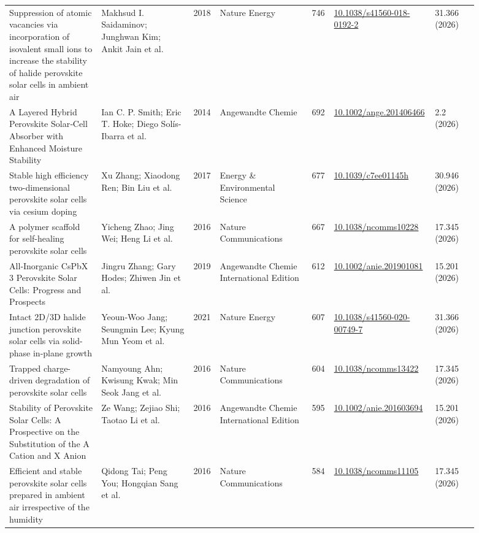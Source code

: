 \documentclass[10pt,a4paper]{article}
\begin{document}
{\begin{longtable}{p{0.197\linewidth}p{0.197\linewidth}p{0.043\linewidth}p{0.197\linewidth}p{0.043\linewidth}p{0.117\linewidth}p{0.098\linewidth}}
Suppression of atomic vacancies via incorporation of isovalent small ions to increase the stability of halide perovskite solar cells in ambient air & Makhsud I. Saidaminov; Junghwan Kim; Ankit Jain et al. & 2018 & Nature Energy & 746 & \href{https://doi.org/10.1038/s41560-018-0192-2}{10.1038/s41560-018-0192-2} & 31.366 (2026) \\
A Layered Hybrid Perovskite Solar‐Cell Absorber with Enhanced Moisture Stability & Ian C. P. Smith; Eric T. Hoke; Diego Solís-Ibarra et al. & 2014 & Angewandte Chemie & 692 & \href{https://doi.org/10.1002/ange.201406466}{10.1002/ange.201406466} & 2.2 (2026) \\
Stable high efficiency two-dimensional perovskite solar cells via cesium doping & Xu Zhang; Xiaodong Ren; Bin Liu et al. & 2017 & Energy \& Environmental Science & 677 & \href{https://doi.org/10.1039/c7ee01145h}{10.1039/c7ee01145h} & 30.946 (2026) \\
A polymer scaffold for self-healing perovskite solar cells & Yicheng Zhao; Jing Wei; Heng Li et al. & 2016 & Nature Communications & 667 & \href{https://doi.org/10.1038/ncomms10228}{10.1038/ncomms10228} & 17.345 (2026) \\
All‐Inorganic CsPbX 3 Perovskite Solar Cells: Progress and Prospects & Jingru Zhang; Gary Hodes; Zhiwen Jin et al. & 2019 & Angewandte Chemie International Edition & 612 & \href{https://doi.org/10.1002/anie.201901081}{10.1002/anie.201901081} & 15.201 (2026) \\
Intact 2D/3D halide junction perovskite solar cells via solid-phase in-plane growth & Yeoun‐Woo Jang; Seungmin Lee; Kyung Mun Yeom et al. & 2021 & Nature Energy & 607 & \href{https://doi.org/10.1038/s41560-020-00749-7}{10.1038/s41560-020-00749-7} & 31.366 (2026) \\
Trapped charge-driven degradation of perovskite solar cells & Namyoung Ahn; Kwisung Kwak; Min Seok Jang et al. & 2016 & Nature Communications & 604 & \href{https://doi.org/10.1038/ncomms13422}{10.1038/ncomms13422} & 17.345 (2026) \\
Stability of Perovskite Solar Cells: A Prospective on the Substitution of the A Cation and X Anion & Ze Wang; Zejiao Shi; Taotao Li et al. & 2016 & Angewandte Chemie International Edition & 595 & \href{https://doi.org/10.1002/anie.201603694}{10.1002/anie.201603694} & 15.201 (2026) \\
Efficient and stable perovskite solar cells prepared in ambient air irrespective of the humidity & Qidong Tai; Peng You; Hongqian Sang et al. & 2016 & Nature Communications & 584 & \href{https://doi.org/10.1038/ncomms11105}{10.1038/ncomms11105} & 17.345 (2026) \\

\end{longtable}}
\end{document}
